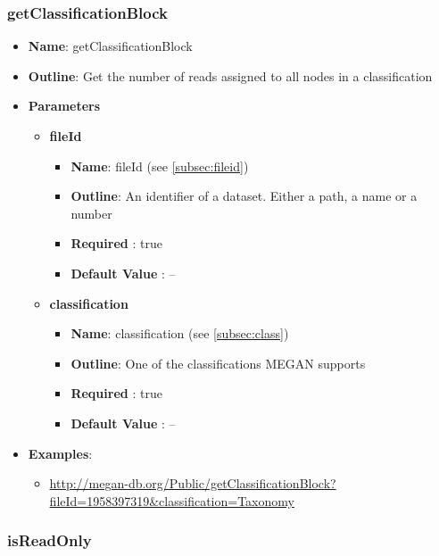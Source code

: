 \documentclass[11pt]{article}
\begin{document}
\subsubsection{getClassificationBlock}

\begin{itemize}
	\item \textbf{Name}: getClassificationBlock
	\item \textbf{Outline}: Get the number of reads assigned to all nodes in a classification
	\item \textbf{Parameters}
		\begin{itemize}
			\item \textbf{fileId}
				\begin{itemize}
					\item \textbf{Name}: fileId (see \ref{subsec:fileid})
					\item \textbf{Outline}: An identifier of a dataset. Either a path, a name or a number
					\item \textbf{Required} : true
					\item \textbf{Default Value} : --
				\end{itemize}
			\item \textbf{classification}
				\begin{itemize}
					\item \textbf{Name}: classification (see \ref{subsec:class})
					\item \textbf{Outline}: One of the classifications MEGAN supports
					\item \textbf{Required} : true
					\item \textbf{Default Value} : --
				\end{itemize}
		\end{itemize}
	\item \textbf{Examples}:
		\begin{itemize}
			\item \url{http://megan-db.org/Public/getClassificationBlock?fileId=1958397319&classification=Taxonomy}
		\end{itemize}
\end{itemize}

\subsubsection{isReadOnly}
\end{document}
